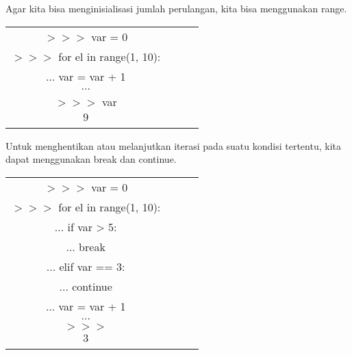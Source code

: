 Agar kita bisa menginisialisasi jumlah perulangan, kita bisa menggunakan range.

\begin{tabular}{|c|c|c|c|}
\hline

$>>>$ var = 0 \\ \linebreak
$>>>$ for el in range(1, 10): \\ \linebreak
$...$ 	var = var + 1 \\ \linebreak
$...$\\ \linebreak
$>>>$ var\\ \linebreak
$9$\\ \linebreak

\end{tabular}


Untuk menghentikan atau melanjutkan iterasi pada suatu kondisi tertentu, kita dapat menggunakan break dan continue.


 
\begin{tabular}{|c|c|c|c|}
\hline
 
$>>>$ var = 0 \\ \linebreak
$>>>$ for el in range(1, 10): \\ \linebreak
$...$ 	if var > 5: \\ \linebreak
$...$ 		break \\ \linebreak
$...$	elif var == 3: \\ \linebreak
$...$ 		continue \\ \linebreak
$...$ 	var = var + 1 \\ \linebreak
$...$ \\ \linebreak
$>>>$  \\ \linebreak
$3$ \\ \linebreak

\end{tabular}



